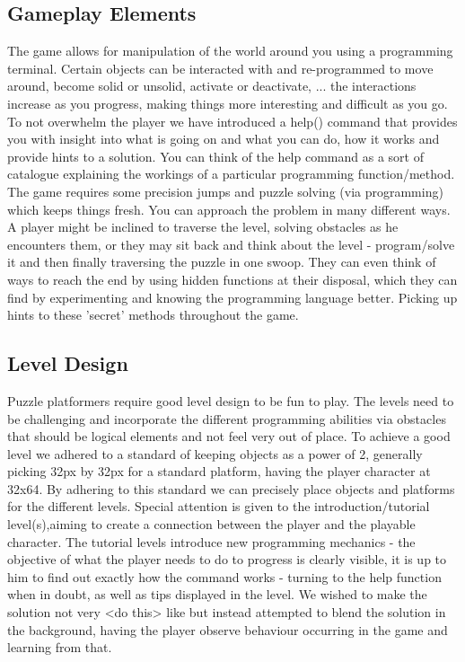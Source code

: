 \documentclass[a4paper,twoside,12pt]{article}
\begin{document}
\subsection{Gameplay Elements}
The game allows for manipulation of the world around you using a programming terminal. Certain objects can be interacted with and re-programmed to move around, become solid or unsolid, activate or deactivate, ...
the interactions increase as you progress, making things more interesting and difficult as you go. To not overwhelm the player we have introduced a help() command that provides you with insight into what is going on and what you can do, how it works and provide hints to a solution. You can think of the help command as a sort of catalogue explaining the workings of a particular programming function/method. The game requires some precision jumps and puzzle solving (via programming) which keeps things fresh. You can approach the problem in many different ways. A player might be inclined to traverse the level, solving obstacles as he encounters them, or they may sit back and think about the level - program/solve it and then finally traversing the puzzle in one swoop. They can even think of ways to reach the end by using hidden functions at their disposal, which they can find by experimenting and knowing the programming language better. Picking up hints to these 'secret' methods throughout the game.

\subsection{Level Design}

Puzzle platformers require good level design to be fun to play. The levels need to be challenging and incorporate the different programming abilities via obstacles that should be logical elements and not feel very out of place. To achieve a good level we adhered to a standard of keeping objects as a power of 2, generally picking 32px by 32px for a standard platform, having the player character at 32x64. By adhering to this standard we can precisely place objects and platforms for the different levels.
Special attention is given to the introduction/tutorial level(s),aiming to
create a connection between the player and the playable character. The
tutorial levels introduce new programming mechanics - the objective of what
the player needs to do to progress is clearly visible, it is up to him to find
out exactly how the command works - turning to the help function when in
doubt, as well as tips displayed in the level. We wished to make the solution
not very <do this> like but instead attempted to blend the solution in the
background, having the player observe behaviour occurring in the game and
learning from that.
\end{document}
